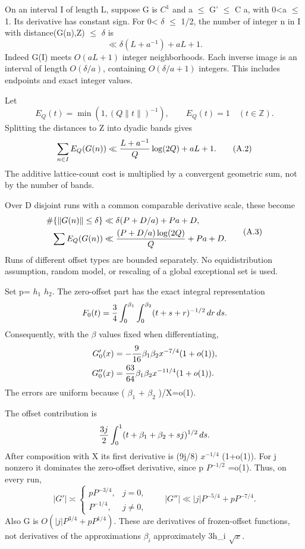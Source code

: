\documentclass[11pt,a4paper]{article}
\begin{document}
On an interval I of length L, suppose G is \(C^{1}\) and a \(\le\)
\textbar G'\textbar{} \(\le\) C a, with 0\textless a \(\le\) 1. Its
derivative has constant sign. For 0\textless{} \(\delta\) \(\le\) 1/2,
the number of integer n in I with distance(G(n),Z) \(\le\) \(\delta\) is
\[
\ll \delta(L+a^{-1})+aL+1. \tag{A.1}
\] Indeed G(I) meets \(O(aL+1)\) integer neighborhoods. Each inverse
image is an interval of length \(O(\delta/a)\), containing
\(O(\delta/a+1)\) integers. This includes endpoints and exact integer
values.

Let \[
E_Q(t)=\min(1,(Q\|t\|)^{-1}),\qquad E_Q(t)=1\quad(t\in\mathbb Z).
\] Splitting the distances to Z into dyadic bands gives \[
\sum_{n\in I}E_Q(G(n))
\ll {L+a^{-1}\over Q}\log(2Q)+aL+1. \tag{A.2}
\] The additive lattice-count cost is multiplied by a convergent
geometric sum, not by the number of bands.

Over D disjoint runs with a common comparable derivative scale, these
become \[
\begin{split}
\#\{\|G(n)\|\le\delta\}
&\ll \delta(P+D/a)+Pa+D,\\
\sum E_Q(G(n))
&\ll {(P+D/a)\log(2Q)\over Q}+Pa+D.
\end{split}\tag{A.3}
\] Runs of different offset types are bounded separately. No
equidistribution assumption, random model, or rescaling of a global
exceptional set is used.

Set p= \(h_1\) \(h_2\). The zero-offset part has the exact integral
representation \[
F_0(t)={3\over4}\int_0^{\beta_1}\int_0^{\beta_2}
(t+s+r)^{-1/2}\,dr\,ds.
\] Consequently, with the \(\beta\) values fixed when differentiating,
\[
\begin{split}
G_0'(x)&=-{9\over16}\beta_1\beta_2 x^{-7/4}(1+o(1)),\\
G_0''(x)&={63\over64}\beta_1\beta_2 x^{-11/4}(1+o(1)).
\end{split}
\] The errors are uniform because ( \(\beta_1\) + \(\beta_2\) )/X=o(1).

The offset contribution is \[
{3j\over2}\int_0^1
(t+\beta_1+\beta_2+s j)^{1/2}\,ds.
\] After composition with X its first derivative is (9j/8) \(x^{-1/4}\)
(1+o(1)). For j nonzero it dominates the zero-offset derivative, since p
\(P^{-1/2}\) =o(1). Thus, on every run, \[
|G'|\asymp
\begin{cases}
pP^{-3/4},&j=0,\\
P^{-1/4},&j\ne0,
\end{cases}
\qquad
|G''|\ll |j|P^{-5/4}+pP^{-7/4}. \tag{A.4}
\] Also \textbar G\textbar{} is \(O(|j|P^{3/4}+pP^{1/4})\). These are
derivatives of frozen-offset functions, not derivatives of the
approximations \(\beta_i\) approximately 3h\_i \(\sqrt{x}\).
\end{document}
